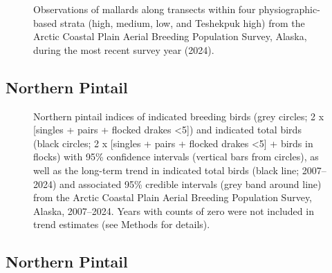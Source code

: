\documentclass[
]{article}
\begin{document}
\begin{figure}


\caption{\label{fig-MALLmap}Observations of mallards along transects
within four physiographic-based strata (high, medium, low, and Teshekpuk
high) from the Arctic Coastal Plain Aerial Breeding Population Survey,
Alaska, during the most recent survey year (2024).}

\end{figure}%

\newpage{}

\subsection*{Northern Pintail}\label{northern-pintail}

\begin{figure}


\caption{\label{fig-NOPI}Northern pintail indices of indicated breeding
birds (grey circles; 2 x {[}singles + pairs + flocked drakes
\textless5{]}) and indicated total birds (black circles; 2 x {[}singles
+ pairs + flocked drakes \textless5{]} + birds in flocks) with 95\%
confidence intervals (vertical bars from circles), as well as the
long-term trend in indicated total birds (black line; 2007--2024) and
associated 95\% credible intervals (grey band around line) from the
Arctic Coastal Plain Aerial Breeding Population Survey, Alaska,
2007--2024. Years with counts of zero were not included in trend
estimates (see Methods for details).}

\end{figure}%

\newpage{}

\subsection*{Northern Pintail}\label{northern-pintail-1}

\begingroup\fontsize{10}{12}\selectfont
\end{document}
